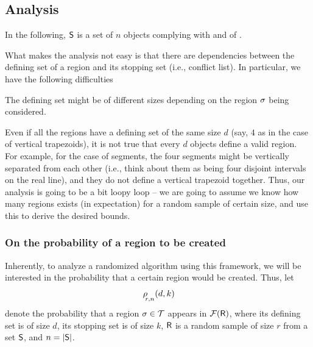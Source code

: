 \subsection{Analysis}

In the following, $\mathsf{S}$ is a set of $n$ objects complying with
 and  of .

\bigskip

%
What makes the analysis not easy is that there are dependencies
between the defining set of a region and its stopping set (i.e.,
conflict list). In particular, we have the following difficulties
\begin{compactenumA}
    \item The defining set might be of different sizes depending on
    the region $\sigma$ being considered.

    \item Even if all the regions have a defining set of the same size
    $d$ (say, $4$ as in the case of vertical trapezoids), it is not
    true that every $d$ objects define a valid region. For example,
    for the case of segments, the four segments might be vertically
    separated from each other (i.e., think about them as being four
    disjoint intervals on the real line), and they do not define a
    vertical trapezoid together. Thus, our analysis is going to be a
    bit loopy loop -- we are going to assume we know how many regions
    exists (in expectation) for a random sample of certain size, and
    use this to derive the desired bounds.
\end{compactenumA}


\subsubsection{On the probability of a region to be created}


Inherently, to analyze a randomized algorithm using this framework, we
will be interested in the probability that a certain region would be
created. Thus, let
\begin{equation*}
    \CSProbFull{r}{d}{k}{n}
\end{equation*}
denote the probability that a region $\sigma \in \mathcal{T}$ appears
in $\RegionsSet{\Sample}$, where its defining set is of size $d$, its
stopping set is of size $k$, $\mathsf{R}$ is a random sample
 of size $r$ from a set $\mathsf{S}$, and
$n=\left| {\mathsf{S}} \right|$.  



